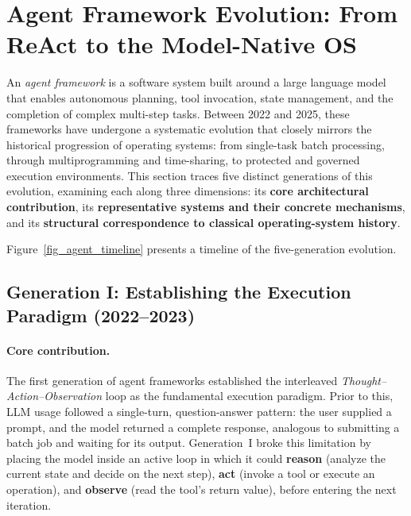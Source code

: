 \section{Agent Framework Evolution: From ReAct to the Model-Native OS}
\label{sec:agentevolution}

An \textit{agent framework} is a software system built around a large language model that enables autonomous planning, tool invocation, state management, and the completion of complex multi-step tasks.
Between 2022 and 2025, these frameworks have undergone a systematic evolution that closely mirrors the historical progression of operating systems: from single-task batch processing, through multiprogramming and time-sharing, to protected and governed execution environments.
This section traces five distinct generations of this evolution, examining each along three dimensions: its \textbf{core architectural contribution}, its \textbf{representative systems and their concrete mechanisms}, and its \textbf{structural correspondence to classical operating-system history}.

Figure~\ref{fig_agent_timeline} presents a timeline of the five-generation evolution.


\subsection{Generation I: Establishing the Execution Paradigm (2022--2023)}

\paragraph{Core contribution.}
The first generation of agent frameworks established the interleaved \textit{Thought--Action--Observation} loop as the fundamental execution paradigm.
Prior to this, LLM usage followed a single-turn, question-answer pattern: the user supplied a prompt, and the model returned a complete response, analogous to submitting a batch job and waiting for its output.
Generation~I broke this limitation by placing the model inside an active loop in which it could \textbf{reason} (analyze the current state and decide on the next step), \textbf{act} (invoke a tool or execute an operation), and \textbf{observe} (read the tool's return value), before entering the next iteration.

